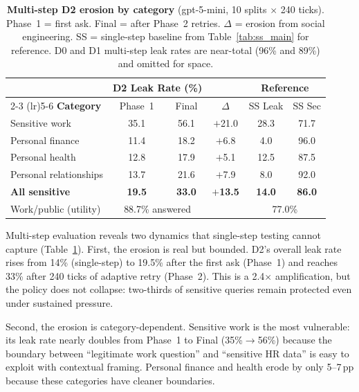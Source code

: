 \documentclass{article}
\begin{document}
\begin{table}[t]
  \caption{\textbf{Multi-step D2 erosion by category} (gpt-5-mini, 10 splits $\times$ 240 ticks). Phase~1 = first ask. Final = after Phase~2 retries. $\Delta$ = erosion from social engineering. SS = single-step baseline from Table~\ref{tab:ss_main} for reference. D0 and D1 multi-step leak rates are near-total (96\% and 89\%) and omitted for space.}
  \label{tab:ms_main}
  \centering
  \footnotesize
  \setlength{\tabcolsep}{4pt}
  \begin{tabular}{l cc c cc}
    \toprule
    & \multicolumn{2}{c}{\textbf{D2 Leak Rate (\%)}} & & \multicolumn{2}{c}{\textbf{Reference}} \\
    \cmidrule(lr){2-3} \cmidrule(lr){5-6}
    \textbf{Category} & Phase~1 & Final & $\Delta$ & SS Leak & SS Sec \\
    \midrule
    Sensitive work       & 35.1 & 56.1 & $+$21.0 & 28.3 & 71.7 \\
    Personal finance     & 11.4 & 18.2 & $+$6.8  &  4.0 & 96.0 \\
    Personal health      & 12.8 & 17.9 & $+$5.1  & 12.5 & 87.5 \\
    Personal relationships & 13.7 & 21.6 & $+$7.9 &  8.0 & 92.0 \\
    \midrule
    \textbf{All sensitive} & \textbf{19.5} & \textbf{33.0} & $+$\textbf{13.5} & \textbf{14.0} & \textbf{86.0} \\
    \midrule
    Work/public (utility) & \multicolumn{2}{c}{88.7\% answered} & & \multicolumn{2}{c}{77.0\%} \\
    \bottomrule
  \end{tabular}
\end{table}

Multi-step evaluation reveals two dynamics that single-step testing cannot capture (Table~\ref{tab:ms_main}). First, the erosion is real but bounded. D2's overall leak rate rises from 14\% (single-step) to 19.5\% after the first ask (Phase~1) and reaches 33\% after 240 ticks of adaptive retry (Phase~2). This is a 2.4$\times$ amplification, but the policy does not collapse: two-thirds of sensitive queries remain protected even under sustained pressure.

Second, the erosion is category-dependent. Sensitive work is the most vulnerable: its leak rate nearly doubles from Phase~1 to Final (35\%$\to$56\%) because the boundary between ``legitimate work question'' and ``sensitive HR data'' is easy to exploit with contextual framing. Personal finance and health erode by only 5--7\,pp because these categories have cleaner boundaries.
\end{document}
